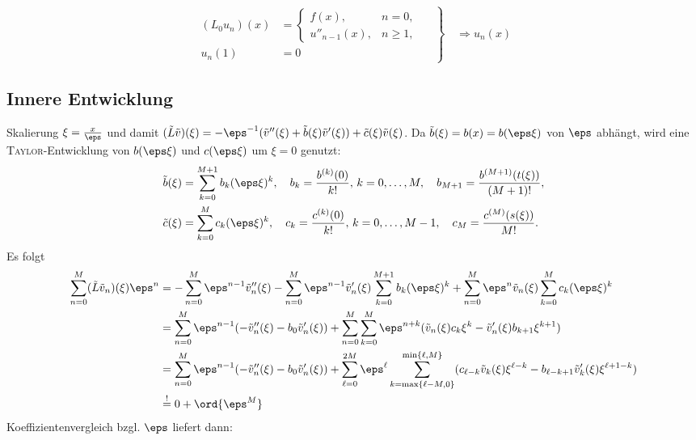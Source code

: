 \begin{equation}
  \left.
    \begin{aligned}
      (L_0 u_n)(x)&=\begin{cases}
        f(x),&n=0,\\
        u''_{n-1}(x),&n\geq 1,
      \end{cases}\\
      u_n(1)&=0
    \end{aligned}
    \quad
  \right\}
  \quad\Rightarrow
  u_n(x)\label{eq:un}
\end{equation}

\subsection*{Innere Entwicklung}
Skalierung $\xi=\frac{x}{\eps}$ und damit $(\tilde L\tilde v)(\xi)=-\eps^{-1}(\tilde v''(\xi)+\tilde b(\xi)\tilde v'(\xi))+\tilde c(\xi)\tilde v(\xi)$.
Da $\tilde b(\xi)=b(x)=b(\eps\xi)$ von $\eps$ abhängt, wird eine \textsc{Taylor}-Entwicklung von $b(\eps\xi)$ und
$c(\eps\xi)$ um $\xi=0$ genutzt:
\begin{align*}
  \tilde b(\xi)
  &%
  =\sum_{k=0}^{M+1}b_k(\eps\xi)^k,\quad
  b_k=\frac{b^{(k)}(0)}{k!},\,k=0,\dots,M,\quad
  b_{M+1}=\frac{b^{(M+1)}(t(\xi))}{(M+1)!},\\
  \tilde c(\xi)
  &%
  =\sum_{k=0}^{M}c_k(\eps\xi)^k,\quad
  c_k=\frac{c^{(k)}(0)}{k!},\,k=0,\dots,M-1,\quad
  c_M=\frac{c^{(M)}(s(\xi))}{M!}.
\end{align*}
Es folgt
\begin{align*}
  \sum_{n=0}^M(\tilde L\tilde v_n)(\xi)\eps^n
  &= -\sum_{n=0}^M\eps^{n-1}\tilde v_n''(\xi)
  -\sum_{n=0}^M\eps^{n-1}\tilde v_n'(\xi)\sum_{k=0}^{M+1}b_k(\eps\xi)^k
  +\sum_{n=0}^M\eps^{n}\tilde v_n(\xi)\sum_{k=0}^{M}c_k(\eps\xi)^k\\
  &= \sum_{n=0}^M\eps^{n-1}(-\tilde v_n''(\xi)-b_0\tilde v_n'(\xi))
  +\sum_{n=0}^M\sum_{k=0}^{M}\eps^{n+k}(\tilde v_n(\xi)c_k\xi^k-\tilde v_n'(\xi)b_{k+1}\xi^{k+1})\\
  &= \sum_{n=0}^M\eps^{n-1}(-\tilde v_n''(\xi)-b_0\tilde v_n'(\xi))
  +\sum_{\ell=0}^{2M}\eps^\ell\sum_{k=\max\{\ell-M,0\}}^{\min\{\ell,M\}}(c_{\ell-k}\tilde v_k(\xi)\xi^{\ell-k}-b_{\ell-k+1}\tilde v_k'(\xi)\xi^{\ell+1-k})\\
  &\stackrel{!}{=}0+\ord{\eps^M}
\end{align*}
Koeffizientenvergleich bzgl. $\eps$ liefert dann:
